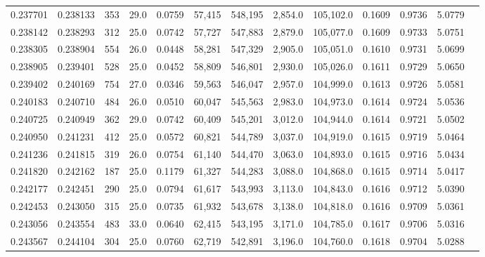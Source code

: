 \begin{tabular}{rrrrrrrrrrrrr}
0.237701 & 0.238133 &   353 & 29.0 &                                     0.0759 &  57,415 & 548,195 &   2,854.0 & 105,102.0 & 0.1609 & 0.9736 & 5.0779 \\
0.238142 & 0.238293 &   312 & 25.0 &                                     0.0742 &  57,727 & 547,883 &   2,879.0 & 105,077.0 & 0.1609 & 0.9733 & 5.0751 \\
0.238305 & 0.238904 &   554 & 26.0 &                                     0.0448 &  58,281 & 547,329 &   2,905.0 & 105,051.0 & 0.1610 & 0.9731 & 5.0699 \\
0.238905 & 0.239401 &   528 & 25.0 &                                     0.0452 &  58,809 & 546,801 &   2,930.0 & 105,026.0 & 0.1611 & 0.9729 & 5.0650 \\
0.239402 & 0.240169 &   754 & 27.0 &                                     0.0346 &  59,563 & 546,047 &   2,957.0 & 104,999.0 & 0.1613 & 0.9726 & 5.0581 \\
0.240183 & 0.240710 &   484 & 26.0 &                                     0.0510 &  60,047 & 545,563 &   2,983.0 & 104,973.0 & 0.1614 & 0.9724 & 5.0536 \\
0.240725 & 0.240949 &   362 & 29.0 &                                     0.0742 &  60,409 & 545,201 &   3,012.0 & 104,944.0 & 0.1614 & 0.9721 & 5.0502 \\
0.240950 & 0.241231 &   412 & 25.0 &                                     0.0572 &  60,821 & 544,789 &   3,037.0 & 104,919.0 & 0.1615 & 0.9719 & 5.0464 \\
0.241236 & 0.241815 &   319 & 26.0 &                                     0.0754 &  61,140 & 544,470 &   3,063.0 & 104,893.0 & 0.1615 & 0.9716 & 5.0434 \\
0.241820 & 0.242162 &   187 & 25.0 &                                     0.1179 &  61,327 & 544,283 &   3,088.0 & 104,868.0 & 0.1615 & 0.9714 & 5.0417 \\
0.242177 & 0.242451 &   290 & 25.0 &                                     0.0794 &  61,617 & 543,993 &   3,113.0 & 104,843.0 & 0.1616 & 0.9712 & 5.0390 \\
0.242453 & 0.243050 &   315 & 25.0 &                                     0.0735 &  61,932 & 543,678 &   3,138.0 & 104,818.0 & 0.1616 & 0.9709 & 5.0361 \\
0.243056 & 0.243554 &   483 & 33.0 &                                     0.0640 &  62,415 & 543,195 &   3,171.0 & 104,785.0 & 0.1617 & 0.9706 & 5.0316 \\
0.243567 & 0.244104 &   304 & 25.0 &                                     0.0760 &  62,719 & 542,891 &   3,196.0 & 104,760.0 & 0.1618 & 0.9704 & 5.0288 \\

\end{tabular}
